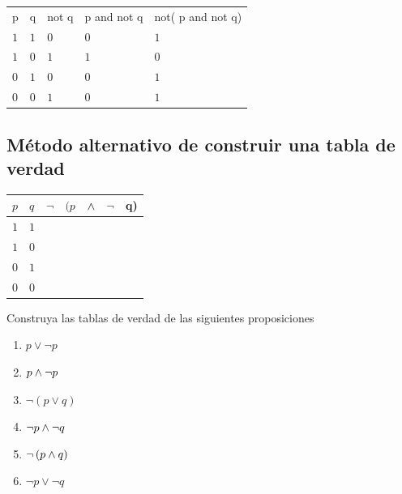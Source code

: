\begin{solucion}
	\begin{tdv}[$\neg\left( p \wed \neg q \right)$]
		
		\hfill
		\begin{center}
			\begin{tabular}{lllll}
				p & q & not q & p and not q & not( p and not q) \\
				$1$ & $1$ & $0$ & $0$ & $1$ \\
				$1$ & $0$ & $1$ & $1$ & $0$ \\
				$0$ & $1$ & $0$ & $0$ & $1$ \\
				$0$ & $0$ & $1$ & $0$ & $1$ \\
			\end{tabular}
		\end{center}
	\end{tdv}
\end{solucion}



 \subsection{Método alternativo de construir una tabla de verdad}
\begin{center}
\begin{tabular}{|l|l|l|l|l|l|l|}\hline
 $p$ & $q$ & $\neg$ & $(p$ & $\wedge$ & $\neg$ & q) \\\hline
 $1$ & $1$ &  &  & &  & \\\hline
 $1$ & $0$ &  &  & &  & \\\hline
 $0$ & $1$ &  &  & &  & \\\hline
 $0$ & $0$ &  &  & &  & \\\hline
\end{tabular}
\end{center}




\begin{problema} Construya las tablas de verdad de las siguientes proposiciones
\begin{enumerate}
 \item $p\vee \neg p$
 \item $p\wedge \neg p$
 \item $\neg\left( p \vee q \right)$
 \item $\neg p \wedge \neg q$
 \item $\neg\left( p \wedge q \right)$
 \item $\neg p \vee \neg q$
\end{enumerate}


\end{problema}


